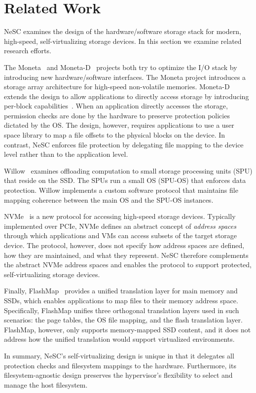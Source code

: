 \section{Related Work}
\label{sec:related}

NeSC examines the design of the hardware/software storage stack for modern, high-speed, self-virtualizing storage devices. In this section we examine related research efforts.

The Moneta~\cite{caulfield10moneta} and Moneta-D~\cite{caulfield12moneta-d} projects both try to optimize the I/O stack by introducing new hardware/software interfaces.
The Moneta project introduces a storage array architecture for high-speed non-volatile memories. Moneta-D extends the design to allow applications
to directly access storage by introducing per-block capabilities~\cite{levy1984capability}. When an application directly accesses the storage, permission checks are done by the hardware to preserve protection policies dictated by the OS.
The design, however, requires applications to use a user space library to map a file offsets to the physical blocks on the device.
In contrast, NeSC enforces file protection by delegating file mapping to the device level rather than to the application level.

Willow~\cite{seshadri2014willow} examines offloading computation to small storage processing units (SPU) that reside on the SSD. The SPUs run a small OS (SPU-OS) that enforces data protection. Willow implements a custom software protocol that maintains file mapping coherence between the main OS and the SPU-OS instances.

NVMe~\cite{nvme} is a new protocol for accessing high-speed storage devices. Typically implemented over PCIe, NVMe defines an abstract concept of \emph{address spaces} through which applications and VMs can access subsets of the target storage device. The protocol, however, does not specify how address spaces are defined, how they are maintained, and what they represent. 
NeSC therefore complements the abstract NVMe address spaces and enables the protocol to support protected, self-virtualizing storage devices.

Finally, FlashMap~\cite{huang2015unified} provides a unified translation layer for main memory and SSDs, which enables applications to map files to their memory address space. Specifically, FlashMap unifies three orthogonal translation layers used in such scenarios: the page tables, the OS file mapping, and the flash translation layer.
FlashMap, however, only supports memory-mapped SSD content, and it does not address how the unified translation would support virtualized environments.

In summary, NeSC's self-virtualizing design is unique in that it delegates all protection checks and filesystem mappings to the hardware. Furthermore, its  filesystem-agnostic design preserves the hypervisor's flexibility to select and manage the host filesystem.



